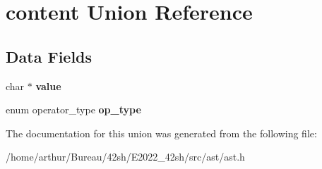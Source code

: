 \hypertarget{unioncontent}{}\section{content Union Reference}
\label{unioncontent}
\subsection*{Data Fields}
\begin{DoxyCompactItemize}
\item 
\mbox{\label{unioncontent_a4e9aec275e566b978a3ccb4e043d8c61}} 
char $\ast$ {\bfseries value}
\item 
\mbox{\label{unioncontent_a1be76442f15a6531523ee7cc391e08d1}} 
enum operator\+\_\+type {\bfseries op\+\_\+type}
\end{DoxyCompactItemize}


The documentation for this union was generated from the following file\+:\begin{DoxyCompactItemize}
\item 
/home/arthur/\+Bureau/42sh/\+E2022\+\_\+42sh/src/ast/ast.\+h\end{DoxyCompactItemize}
